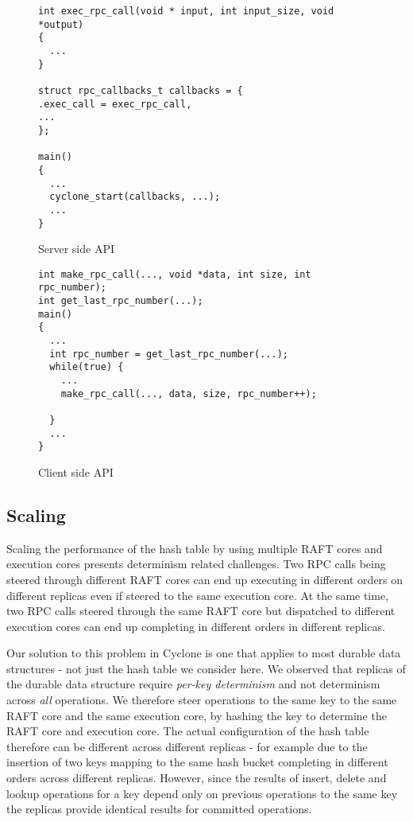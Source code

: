 \documentclass[twocolumn]{article}
\begin{document}
\begin{figure}
{ \scriptsize
\begin{verbatim}
int exec_rpc_call(void * input, int input_size, void *output)
{ 
  ...
}

struct rpc_callbacks_t callbacks = {
.exec_call = exec_rpc_call,
...
};

main()
{
  ...
  cyclone_start(callbacks, ...);
  ...
}
\end{verbatim}
}
\caption{Server side API}
\label{fig:server_api}
\end{figure}

\begin{figure}
{ \scriptsize
\begin{verbatim}
int make_rpc_call(..., void *data, int size, int rpc_number);
int get_last_rpc_number(...);
main()
{
  ...
  int rpc_number = get_last_rpc_number(...);
  while(true) {
    ...
    make_rpc_call(..., data, size, rpc_number++);  
 
  }
  ...
}
\end{verbatim}
}
\caption{Client side API}
\label{fig:client_api}
\end{figure}


\subsection{Scaling}
Scaling the performance of the hash table by using multiple RAFT cores and
execution cores presents determinism related challenges. Two RPC calls being
steered through different RAFT cores can end up executing in different orders on
different replicas even if steered to the same execution core. At the same time,
two RPC calls steered through the same RAFT core but dispatched to different
execution cores can end up completing in different orders in different replicas.

Our solution to this problem in Cyclone is one that applies to most durable
data structures - not just the hash table we consider here. We observed that
replicas of the durable data structure require \emph{per-key determinism}
and not determinism across \emph{all} operations. We therefore steer
operations to the same key to the same RAFT core and the same execution core, by
hashing the key to determine the RAFT core and execution core. The actual
configuration of the hash table therefore can be different across different
replicas - for example due to the insertion of two keys mapping to the same hash
bucket completing in different orders across different replicas. However, since the
results of insert, delete and lookup operations for a key depend only on
previous operations to the same key the replicas provide identical results for
committed operations.
\end{document}
